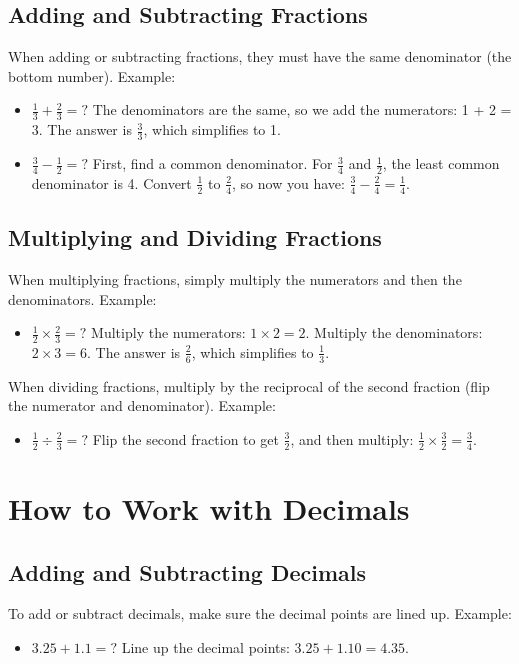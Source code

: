 \subsection{Adding and Subtracting Fractions}
When adding or subtracting fractions, they must have the same denominator (the bottom number). Example:
\begin{itemize}
    \item $\frac{1}{3} + \frac{2}{3} = ?$ The denominators are the same, so we add the numerators: 1 + 2 = 3. The answer is $\frac{3}{3}$, which simplifies to 1.
    \item $\frac{3}{4} - \frac{1}{2} = ?$ First, find a common denominator. For $\frac{3}{4}$ and $\frac{1}{2}$, the least common denominator is 4. Convert $\frac{1}{2}$ to $\frac{2}{4}$, so now you have: $\frac{3}{4} - \frac{2}{4} = \frac{1}{4}$.
\end{itemize}

\subsection{Multiplying and Dividing Fractions}
When multiplying fractions, simply multiply the numerators and then the denominators. Example:
\begin{itemize}
    \item $\frac{1}{2} \times \frac{2}{3} = ?$ Multiply the numerators: $1 \times 2 = 2$. Multiply the denominators: $2 \times 3 = 6$. The answer is $\frac{2}{6}$, which simplifies to $\frac{1}{3}$.
\end{itemize}

When dividing fractions, multiply by the reciprocal of the second fraction (flip the numerator and denominator). Example:
\begin{itemize}
    \item $\frac{1}{2} \div \frac{2}{3} = ?$ Flip the second fraction to get $\frac{3}{2}$, and then multiply: $\frac{1}{2} \times \frac{3}{2} = \frac{3}{4}$.
\end{itemize}

\section{How to Work with Decimals}
\subsection{Adding and Subtracting Decimals}
To add or subtract decimals, make sure the decimal points are lined up. Example:
\begin{itemize}
    \item $3.25 + 1.1 = ?$ Line up the decimal points: $3.25 + 1.10 = 4.35$.
\end{itemize}

